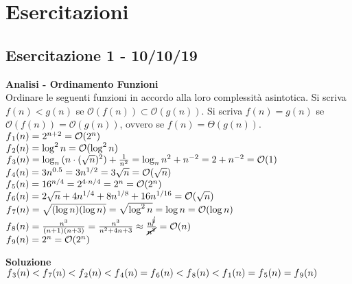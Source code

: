 \documentclass[../cheatSheetAlgoritmi.tex]{subfiles}
\begin{document}
\chapter{Esercitazioni} 
\section{Esercitazione 1 - 10/10/19}
\textbf{Analisi - Ordinamento Funzioni}\\
Ordinare le seguenti funzioni in accordo alla loro complessità asintotica. Si scriva $f(n) < g(n)$ se $\mathcal{O}(f(n)) \subset \mathcal{O}(g(n))$. Si scriva $f(n) = g(n)$ se $\mathcal{O}(f(n)) = \mathcal{O}(g(n))$, ovvero se $f(n) = \Theta(g(n))$.\\
$f\textsubscript{1}(n) = 2^{n+2} = \mathcal{O}(2^{n})$\\
$f\textsubscript{2}(n) = \log^{2}{n} = \mathcal{O}(\log^{2}{n})$\\
$f\textsubscript{3}(n) = \log_{n}{(n \cdot (\sqrt{n})^{2})} + \frac{1}{n^{2}} = \log_{n}{n^{2}} + {n^{-2}} = 2 + {n^{-2}} = \mathcal{O}(1)$\\
$f\textsubscript{4}(n) = 3n^{0.5} = 3n^{1/2} = 3 \sqrt{n} = \mathcal{O}(\sqrt{n})$\\
$f\textsubscript{5}(n) = 16^{n/4} = 2^{4 \cdot n/4} = 2^{n} = \mathcal{O}(2^{n})$\\
$f\textsubscript{6}(n) =2 \sqrt{n} + 4n^{1/4} + 8n^{1/8} + 16n^{1/16} = \mathcal{O}(\sqrt{n})$\\
$f\textsubscript{7}(n) = \sqrt{(\log{n})(\log{n})} = \sqrt{\log^{2}{n}} = \log{n} = \mathcal{O}(\log{n})$\\
$f\textsubscript{8}(n) = \frac{n^3}{(n+1)(n+3)} = \frac{n^3}{n^{2} + 4n + 3} \approx \frac{n^{\cancel{3}}}{\cancel{n^{2}}} = \mathcal{O}(n)$\\
$f\textsubscript{9}(n) = 2^{n} = \mathcal{O}(2^{n})$

\bigskip
\textbf{Soluzione}\\
$f\textsubscript{3}(n) < f\textsubscript{7}(n) < f\textsubscript{2}(n) < f\textsubscript{4}(n) = f\textsubscript{6}(n) < f\textsubscript{8}(n) < f\textsubscript{1}(n) = f\textsubscript{5}(n) = f\textsubscript{9}(n)$
\end{document}

